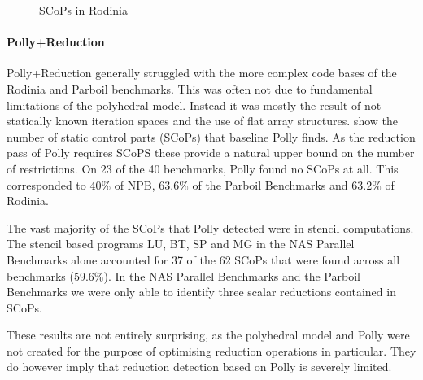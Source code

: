 \begin{figure}[ht]
    \centering
    \caption{SCoPs in Rodinia}
    \label{rodinia_scops}
\end{figure}

\paragraph{Polly+Reduction}
Polly+Reduction generally struggled with the more complex code bases of the
Rodinia and Parboil benchmarks.  This was often not due to fundamental
limitations of the polyhedral model.  Instead it was mostly the result
of not statically known iteration spaces and the use of flat array
structures. 
show the number of static control
parts (SCoPs) that baseline Polly finds. As the reduction pass of
Polly requires SCoPS these provide a natural upper bound on the
number of restrictions.  On 23 of the 40 benchmarks, Polly found no
SCoPs at all.  This corresponded to $40\%$ of NPB, $63.6\%$ of the
Parboil Benchmarks and $63.2\%$ of Rodinia.

The vast majority of the SCoPs that Polly detected were in stencil computations.
The stencil based programs LU, BT, SP and MG in the NAS Parallel Benchmarks alone accounted for 37 of the 62 SCoPs that were found across all benchmarks ($59.6\%$). 
In the NAS Parallel Benchmarks and the Parboil Benchmarks we were only able to identify three scalar reductions contained in SCoPs.

These results are not entirely surprising, as the polyhedral model and Polly were not created for the purpose of optimising reduction operations in particular.
They do however imply that reduction detection based on Polly is severely limited.

